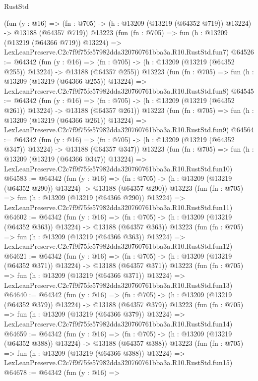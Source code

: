 \begin{lexlean}{RustStd}
\begin{coremodule}
    (fun (y : @16) =>
    (fn : @705) -> (h : @13209 (@13219 (@64352 @719)) @13224) -> @13188 (@64357 @719))
    @13223
    (fun (fn : @705) =>
    fun (h : @13209 (@13219 (@64366 @719)) @13224) =>
    LexLeanPreserve.C2c7f9f75fe57982dda320760761bba3a.R10.RustStd.fun7)
@64526 := @64342
    (fun (y : @16) =>
    (fn : @705) -> (h : @13209 (@13219 (@64352 @255)) @13224) -> @13188 (@64357 @255))
    @13223
    (fun (fn : @705) =>
    fun (h : @13209 (@13219 (@64366 @255)) @13224) =>
    LexLeanPreserve.C2c7f9f75fe57982dda320760761bba3a.R10.RustStd.fun8)
@64545 := @64342
    (fun (y : @16) =>
    (fn : @705) -> (h : @13209 (@13219 (@64352 @261)) @13224) -> @13188 (@64357 @261))
    @13223
    (fun (fn : @705) =>
    fun (h : @13209 (@13219 (@64366 @261)) @13224) =>
    LexLeanPreserve.C2c7f9f75fe57982dda320760761bba3a.R10.RustStd.fun9)
@64564 := @64342
    (fun (y : @16) =>
    (fn : @705) -> (h : @13209 (@13219 (@64352 @347)) @13224) -> @13188 (@64357 @347))
    @13223
    (fun (fn : @705) =>
    fun (h : @13209 (@13219 (@64366 @347)) @13224) =>
    LexLeanPreserve.C2c7f9f75fe57982dda320760761bba3a.R10.RustStd.fun10)
@64583 := @64342
    (fun (y : @16) =>
    (fn : @705) -> (h : @13209 (@13219 (@64352 @290)) @13224) -> @13188 (@64357 @290))
    @13223
    (fun (fn : @705) =>
    fun (h : @13209 (@13219 (@64366 @290)) @13224) =>
    LexLeanPreserve.C2c7f9f75fe57982dda320760761bba3a.R10.RustStd.fun11)
@64602 := @64342
    (fun (y : @16) =>
    (fn : @705) -> (h : @13209 (@13219 (@64352 @363)) @13224) -> @13188 (@64357 @363))
    @13223
    (fun (fn : @705) =>
    fun (h : @13209 (@13219 (@64366 @363)) @13224) =>
    LexLeanPreserve.C2c7f9f75fe57982dda320760761bba3a.R10.RustStd.fun12)
@64621 := @64342
    (fun (y : @16) =>
    (fn : @705) -> (h : @13209 (@13219 (@64352 @371)) @13224) -> @13188 (@64357 @371))
    @13223
    (fun (fn : @705) =>
    fun (h : @13209 (@13219 (@64366 @371)) @13224) =>
    LexLeanPreserve.C2c7f9f75fe57982dda320760761bba3a.R10.RustStd.fun13)
@64640 := @64342
    (fun (y : @16) =>
    (fn : @705) -> (h : @13209 (@13219 (@64352 @379)) @13224) -> @13188 (@64357 @379))
    @13223
    (fun (fn : @705) =>
    fun (h : @13209 (@13219 (@64366 @379)) @13224) =>
    LexLeanPreserve.C2c7f9f75fe57982dda320760761bba3a.R10.RustStd.fun14)
@64659 := @64342
    (fun (y : @16) =>
    (fn : @705) -> (h : @13209 (@13219 (@64352 @388)) @13224) -> @13188 (@64357 @388))
    @13223
    (fun (fn : @705) =>
    fun (h : @13209 (@13219 (@64366 @388)) @13224) =>
    LexLeanPreserve.C2c7f9f75fe57982dda320760761bba3a.R10.RustStd.fun15)
@64678 := @64342
    (fun (y : @16) =>

\end{coremodule}
\end{lexlean}
